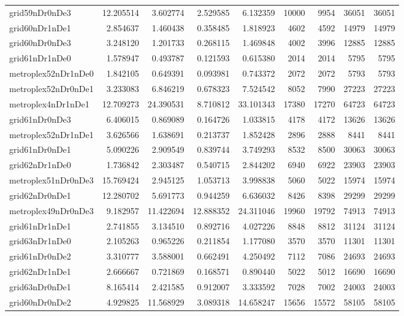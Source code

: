 \begin{longtable}{|l|r|r|r|r|r|r|r|r|}
grid59nDr0nDe3 & 12.205514 & 3.602774 & 2.529585 & 6.132359 & 10000 & 9954 & 36051 & 36051 \\
grid60nDr1nDe1 & 2.854637 & 1.460438 & 0.358485 & 1.818923 & 4602 & 4592 & 14979 & 14979 \\
grid60nDr0nDe3 & 3.248120 & 1.201733 & 0.268115 & 1.469848 & 4002 & 3996 & 12885 & 12885 \\
grid61nDr1nDe0 & 1.578947 & 0.493787 & 0.121593 & 0.615380 & 2014 & 2014 & 5795 & 5795 \\
metroplex52nDr1nDe0 & 1.842105 & 0.649391 & 0.093981 & 0.743372 & 2072 & 2072 & 5793 & 5793 \\
metroplex52nDr0nDe1 & 3.233083 & 6.846219 & 0.678323 & 7.524542 & 8052 & 7990 & 27223 & 27223 \\
metroplex4nDr1nDe1 & 12.709273 & 24.390531 & 8.710812 & 33.101343 & 17380 & 17270 & 64723 & 64723 \\
grid61nDr0nDe3 & 6.406015 & 0.869089 & 0.164726 & 1.033815 & 4178 & 4172 & 13626 & 13626 \\
metroplex52nDr1nDe1 & 3.626566 & 1.638691 & 0.213737 & 1.852428 & 2896 & 2888 & 8441 & 8441 \\
grid61nDr0nDe1 & 5.090226 & 2.909549 & 0.839744 & 3.749293 & 8532 & 8500 & 30063 & 30063 \\
grid62nDr1nDe0 & 1.736842 & 2.303487 & 0.540715 & 2.844202 & 6940 & 6922 & 23903 & 23903 \\
metroplex51nDr0nDe3 & 15.769424 & 2.945125 & 1.053713 & 3.998838 & 5060 & 5022 & 15974 & 15974 \\
grid62nDr0nDe1 & 12.280702 & 5.691773 & 0.944259 & 6.636032 & 8426 & 8398 & 29299 & 29299 \\
metroplex49nDr0nDe3 & 9.182957 & 11.422694 & 12.888352 & 24.311046 & 19960 & 19792 & 74913 & 74913 \\
grid61nDr1nDe1 & 2.741855 & 3.134510 & 0.892716 & 4.027226 & 8848 & 8812 & 31124 & 31124 \\
grid63nDr1nDe0 & 2.105263 & 0.965226 & 0.211854 & 1.177080 & 3570 & 3570 & 11301 & 11301 \\
grid61nDr0nDe2 & 3.310777 & 3.588001 & 0.662491 & 4.250492 & 7112 & 7086 & 24693 & 24693 \\
grid62nDr1nDe1 & 2.666667 & 0.721869 & 0.168571 & 0.890440 & 5022 & 5012 & 16690 & 16690 \\
grid63nDr0nDe1 & 8.165414 & 2.421585 & 0.912007 & 3.333592 & 7028 & 7002 & 24003 & 24003 \\
grid60nDr0nDe2 & 4.929825 & 11.568929 & 3.089318 & 14.658247 & 15656 & 15572 & 58105 & 58105 \\

\end{longtable}
